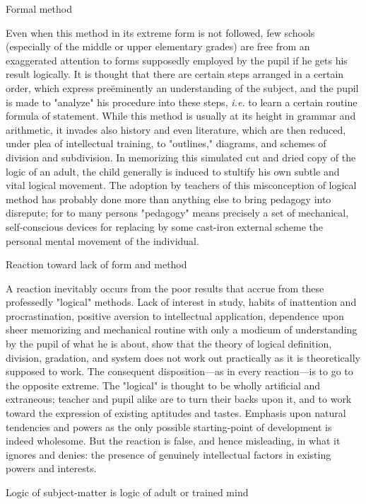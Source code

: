 \documentclass[letterpaper]{book}
\begin{document}
Formal method

Even when this method in its extreme form is not followed, few schools
(especially of the middle or upper elementary grades) are free from an
exaggerated attention to forms supposedly employed by the pupil if he
gets his result logically. It is thought that there are certain steps
arranged in a certain order, which express preëminently an understanding
of the subject, and the pupil is made to "analyze" his procedure into
these steps, \emph{i.e.} to learn a certain routine formula of
statement. While this method is usually at its height in grammar and
arithmetic, it invades also history and even literature, which are then
reduced, under plea of intellectual training, to "outlines," diagrams,
and schemes of division and subdivision. In memorizing this simulated
cut and dried copy of the logic of an adult, the child generally is
induced to stultify his own subtle and vital logical movement. The
adoption by teachers of this misconception of logical method has
probably done more than anything else to bring pedagogy into disrepute;
for to many persons "pedagogy" means precisely a set of mechanical,
self-conscious devices for replacing by
some
cast-iron external scheme the personal mental movement of the
individual.

Reaction toward lack of form and method

A reaction inevitably occurs from the poor results that accrue from
these professedly "logical" methods. Lack of interest in study, habits
of inattention and procrastination, positive aversion to intellectual
application, dependence upon sheer memorizing and mechanical routine
with only a modicum of understanding by the pupil of what he is about,
show that the theory of logical definition, division, gradation, and
system does not work out practically as it is theoretically supposed to
work. The consequent disposition---as in every reaction---is to go to
the opposite extreme. The "logical" is thought to be wholly artificial
and extraneous; teacher and pupil alike are to turn their backs upon it,
and to work toward the expression of existing aptitudes and tastes.
Emphasis upon natural tendencies and powers as the only possible
starting-point of development is indeed wholesome. But the reaction is
false, and hence misleading, in what it ignores and denies: the presence
of genuinely intellectual factors in existing powers and interests.

Logic of subject-matter is logic of adult or trained mind
\end{document}
